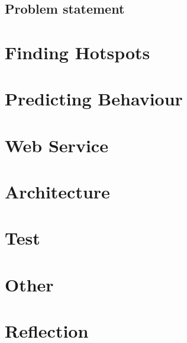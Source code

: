 \section{Problem statement}



\chapter{Finding Hotspots}





\chapter{Predicting Behaviour}






\chapter{Web Service}\label{chap:webservice}




\chapter{Architecture}





\chapter{Test}




\chapter{Other}




\chapter{Reflection}



\appendix






